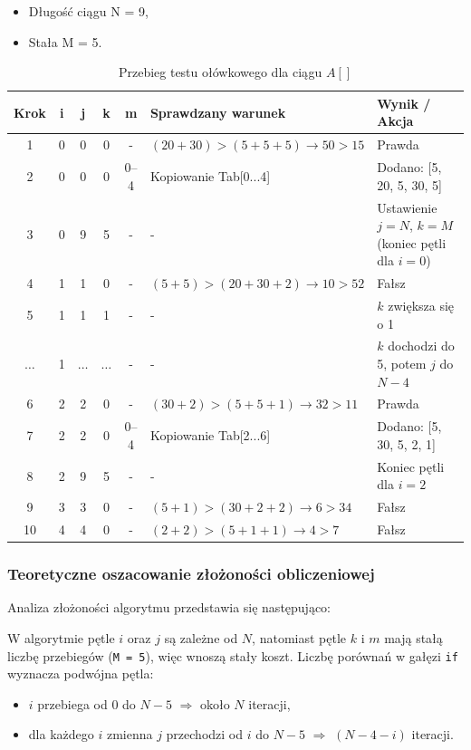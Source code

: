 \documentclass[12pt]{article}
\begin{document}
\begin{itemize}
	\item Długość ciągu N = 9,
	\item Stała M = 5.
\end{itemize}

\begin{table}[H]
\centering
\small
\begin{tabular}{c c c c c p{5cm} p{5cm}}
\hline
Krok & i & j & k & m & Sprawdzany warunek & Wynik / Akcja \\
\hline
1 & 0 & 0 & 0 & - & $(20+30) > (5+5+5) \rightarrow 50 > 15$ & Prawda \\
2 & 0 & 0 & 0 & 0--4 & Kopiowanie Tab[0...4] & Dodano: [5, 20, 5, 30, 5] \\
3 & 0 & 9 & 5 & - & - & Ustawienie $j=N$, $k=M$ (koniec pętli dla $i=0$) \\
4 & 1 & 1 & 0 & - & $(5+5) > (20+30+2) \rightarrow 10 > 52$ & Fałsz \\
5 & 1 & 1 & 1 & - & - & $k$ zwiększa się o 1 \\
$\dots$ & 1 & $\dots$ & $\dots$ & - & - & $k$ dochodzi do 5, potem $j$ do $N-4$ \\
6 & 2 & 2 & 0 & - & $(30+2) > (5+5+1) \rightarrow 32 > 11$ & Prawda \\
7 & 2 & 2 & 0 & 0--4 & Kopiowanie Tab[2...6] & Dodano: [5, 30, 5, 2, 1] \\
8 & 2 & 9 & 5 & - & - & Koniec pętli dla $i=2$ \\
9 & 3 & 3 & 0 & - & $(5+1) > (30+2+2) \rightarrow 6 > 34$ & Fałsz \\
10 & 4 & 4 & 0 & - & $(2+2) > (5+1+1) \rightarrow 4 > 7$ & Fałsz \\
\hline
\end{tabular}
\caption{Przebieg testu ołówkowego dla ciągu $A[]$}
\end{table}

\subsubsection{Teoretyczne oszacowanie złożoności obliczeniowej}
Analiza złożoności algorytmu przedstawia się następująco:

W algorytmie pętle $i$ oraz $j$ są zależne od $N$, natomiast pętle $k$ i $m$ mają stałą liczbę przebiegów (\texttt{M = 5}), więc wnoszą stały koszt. Liczbę porównań w gałęzi \texttt{if} wyznacza podwójna pętla:
\begin{itemize}
	\item $i$ przebiega od $0$ do $N-5$ \;$\Rightarrow$\; około $N$ iteracji,
	\item dla każdego $i$ zmienna $j$ przechodzi od $i$ do $N-5$ \;$\Rightarrow$\; $(N-4-i)$ iteracji.
\end{itemize}
\end{document}
